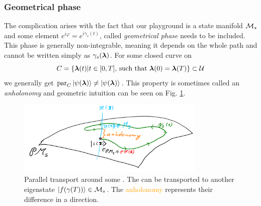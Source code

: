 \subsubsection{Geometrical phase}
The complication arises with the fact that our playground is a state manifold $\mathcal{M}_s$ and some element $e^{i\varphi}=e^{i\gamma_s(t)}$, called \emph{geometrical phase} needs to be included. This phase is generally non-integrable, meaning it depends on the whole path and cannot be written simply as $\gamma_s({\bm\lambda})$. For some closed curve on
\begin{equation}
    C=\{{\bm\lambda}(t)|t\in[0,T] \text{, such that }{\bm\lambda}(0)={\bm\lambda}(T)\}\subset \mathcal U
\end{equation} 
we generally get $\textrm{par}_C \ket{\psi({\bm\lambda})}\neq \ket{\psi({\bm\lambda})}$. This property is sometimes called an \emph{anholonomy} %
and geometric intuition can be seen on Fig. \ref{fig:parallelTransportClosed}. 
\begin{figure}[h]
    \centering
    \includegraphics[width=0.8\textwidth]{../img/parallelTransportClosedCurve_1.png}
\caption{Parallel transport around some . The  can be transported to another eigenstate $\ket{f(\gamma(T))}\in\mathcal{M}_s$. The \textcolor{orange}{anholonomy} represents their difference in a  direction.}
    \label{fig:parallelTransportClosed}
\end{figure}



